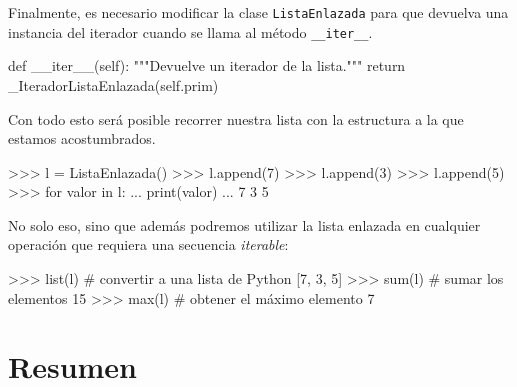 Finalmente, es necesario modificar la clase \lstinline!ListaEnlazada! para que
devuelva una instancia del iterador
cuando se llama al método \lstinline!__iter__!.

\begin{codigo-python-sn}
    def __iter__(self):
        """Devuelve un iterador de la lista."""
        return _IteradorListaEnlazada(self.prim)
\end{codigo-python-sn}

Con todo esto será posible recorrer nuestra lista con la estructura a la
que estamos acostumbrados.

\begin{codigo-python-sn}
>>> l = ListaEnlazada()
>>> l.append(7)
>>> l.append(3)
>>> l.append(5)
>>> for valor in l:
...     print(valor)
...
7
3
5
\end{codigo-python-sn}

No solo eso, sino que además podremos utilizar la lista enlazada en cualquier
operación que requiera una secuencia \emph{iterable}:

\begin{codigo-python-sn}
>>> list(l) # convertir a una lista de Python
[7, 3, 5]
>>> sum(l) # sumar los elementos
15
>>> max(l) # obtener el máximo elemento
7
\end{codigo-python-sn}

\section{Resumen}

